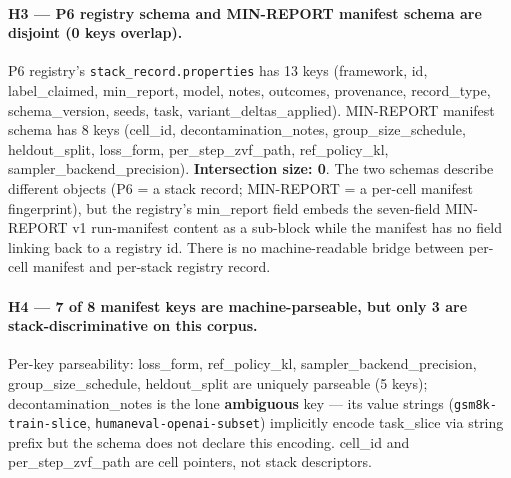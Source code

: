 \documentclass{article}  \usepackage[preprint,nonatbib]{neurips_2026} \usepackage[numbers]{natbib}
\begin{document}
\paragraph{H3 --- P6 registry schema and MIN-REPORT manifest schema
are disjoint (0 keys overlap).}
P6 registry's \texttt{stack\_record.properties} has 13 keys
(\textsf{framework, id, label\_claimed, min\_report, model, notes,
outcomes, provenance, record\_type, schema\_version, seeds, task,
variant\_deltas\_applied}). MIN-REPORT manifest schema has 8 keys
(\textsf{cell\_id, decontamination\_notes, group\_size\_schedule,
heldout\_split, loss\_form, per\_step\_zvf\_path, ref\_policy\_kl,
sampler\_backend\_precision}). \textbf{Intersection size: 0}. The
two schemas describe different objects (P6 = a stack record;
MIN-REPORT = a per-cell manifest fingerprint), but the registry's
\textsf{min\_report} field embeds the seven-field MIN-REPORT v1 run-manifest content as
a sub-block while the manifest has no field linking back to a
registry \textsf{id}. There is no machine-readable bridge between
per-cell manifest and per-stack registry record.

\paragraph{H4 --- 7 of 8 manifest keys are machine-parseable, but
only 3 are stack-discriminative on this corpus.}
Per-key parseability: \textsf{loss\_form, ref\_policy\_kl,
sampler\_backend\_precision, group\_size\_schedule, heldout\_split}
are uniquely parseable (5 keys); \textsf{decontamination\_notes} is
the lone \textbf{ambiguous} key --- its value strings
(\texttt{gsm8k-train-slice}, \texttt{humaneval-openai-subset})
implicitly encode \textsf{task\_slice} via string prefix but the
schema does not declare this encoding. \textsf{cell\_id} and
\textsf{per\_step\_zvf\_path} are cell pointers, not stack
descriptors.
\end{document}
